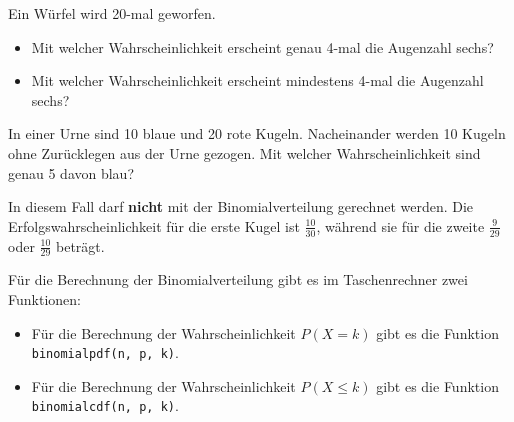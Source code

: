 \begin{bsp}
    {}{}
    Ein Würfel wird 20-mal geworfen.
    \begin{itemize}
        \item Mit welcher Wahrscheinlichkeit erscheint genau 4-mal die Augenzahl sechs?
        \item Mit welcher Wahrscheinlichkeit erscheint mindestens 4-mal die Augenzahl sechs?
    \end{itemize}

    \vspace*{10cm}




\end{bsp}

\begin{bsp}
    {}{}
    In einer Urne sind 10 blaue und 20 rote Kugeln. Nacheinander werden 10 Kugeln ohne Zurücklegen aus der Urne gezogen. Mit welcher Wahrscheinlichkeit sind genau 5 davon blau?

    \bigskip

    In diesem Fall darf \textbf{nicht} mit der Binomialverteilung gerechnet werden. Die Erfolgswahrscheinlichkeit für die erste Kugel ist \(\frac{10}{30}\), während sie für die zweite \(\frac{9}{29}\) oder \(\frac{10}{29}\) beträgt.
\end{bsp}

Für die Berechnung der Binomialverteilung gibt es im Taschenrechner zwei Funktionen:
\begin{itemize}
    \item Für die Berechnung der Wahrscheinlichkeit \( P(X = k) \) gibt es die Funktion \\ \texttt{binomialpdf(n, p, k)}.
    \item Für die Berechnung der Wahrscheinlichkeit \( P(X \le k) \) gibt es die Funktion \\ \texttt{binomialcdf(n, p, k)}.
\end{itemize}

